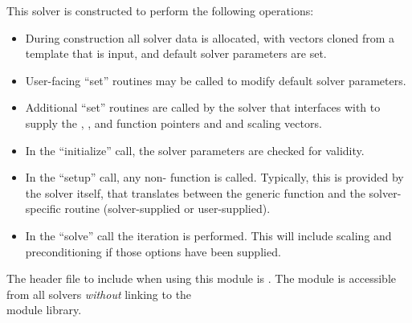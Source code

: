 This solver is constructed to perform the following operations:
\begin{itemize}
\item During construction all {\nvector} solver data is allocated,
  with vectors cloned from a template {\nvector} that is input, and
  default solver parameters are set.
\item User-facing ``set'' routines may be called to modify default
  solver parameters.
\item Additional ``set'' routines are called by the {\sundials} solver
  that interfaces with {\sunlinsolspbcgs} to supply the 
  , , and  function pointers and
   and  scaling vectors.
\item In the ``initialize'' call, the solver parameters are checked
  for validity.
\item In the ``setup'' call, any non- 
   function is called.  Typically, this is provided by
  the {\sundials} solver itself, that translates between the
  generic  function and the
  solver-specific routine (solver-supplied or user-supplied).
\item In the ``solve'' call the {\spbcg} iteration is performed.  This
  will include scaling and preconditioning if those options have been
  supplied.
\end{itemize}

\noindent The header file to include when using this module 
is . The {\sunlinsolspbcgs} module
is accessible from all {\sundials} solvers \textit{without}
linking to the \\
 module library. \\


